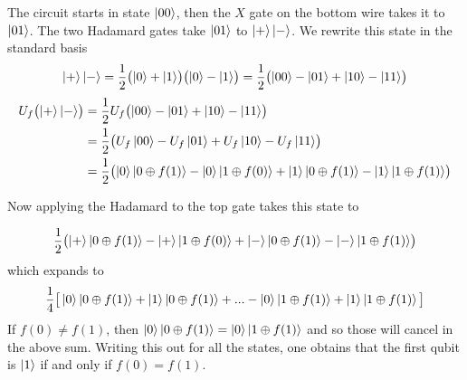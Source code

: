         The circuit starts in state $\ket{00}$, then the $X$ gate on the bottom wire takes it to $\ket{01}$. The 
        two Hadamard gates take $\ket{01}$ to $\ket{+}\ket{-}$. We rewrite this state in the standard basis
        \[
            \ket{+}\ket{-} = \frac{1}{2}\bigl(\ket{0} + \ket{1}\bigr)\bigl(\ket{0} - \ket{1}\bigr) = 
            \frac{1}{2}\bigl(\ket{00} - \ket{01} + \ket{10} - \ket{11}\bigr)
        \]
        \begin{align*}
            U_f\bigl(\ket{+}\ket{-}\bigr) &= \frac{1}{2} U_f\bigl(\ket{00} - \ket{01} + \ket{10} - \ket{11}\bigr) 
            \\
                                          &= \frac{1}{2} \bigl( U_f\ket{00} - U_f\ket{01} + U_f\ket{10} - 
                                          U_f\ket{11} \bigr) \\
                                          &= \frac{1}{2}\bigl( \ket{0}\ket{0 \oplus f(1)} - \ket{0}\ket{1 \oplus 
                                          f(0)} + \ket{1}\ket{0 \oplus f(1)} - \ket{1}\ket{1 \oplus f(1)}\bigr) \\
        \end{align*}

        Now applying the Hadamard to the top gate takes this state to

        \begin{align*}
            \frac{1}{2}\bigl( \ket{+}\ket{0 \oplus f(1)} - \ket{+}\ket{1 \oplus f(0)} + \ket{-}\ket{0 \oplus f(1)} 
        - \ket{-}\ket{1 \oplus f(1)}\bigr)
        \end{align*}
       which expands to
       \[
           \frac{1}{4}\big[ \ket{0}\ket{0 \oplus f(1)} + \ket{1}\ket{0 \oplus f(1)} + ... - \ket{0}\ket{1 \oplus 
           f(1)} + \ket{1}\ket{1 \oplus f(1)} \big]
       \]
       If $f(0) \neq f(1)$, then $\ket{0}\ket{0 \oplus f(1)} = \ket{0}\ket{1 \oplus f(1)}$ and so those will cancel 
       in the above sum. Writing this out for all the states, one obtains that the first qubit is $\ket{1}$ if and 
       only if $f(0) = f(1)$.

        



